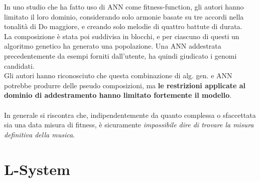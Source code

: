 \documentclass[a4paper,12pt]{report}
\begin{document}
In uno studio che ha fatto uso di ANN come fitness-function, gli autori hanno limitato il loro dominio, considerando solo armonie basate su tre accordi nella tonalità di Do maggiore, e creando solo melodie di quattro battute di durata. \\
La composizione è stata poi suddivisa in blocchi, e per ciascuno di questi un algoritmo genetico ha generato una popolazione.
Una ANN addestrata precedentemente da esempi forniti dall'utente, ha quindi giudicato i genomi candidati. \\
Gli autori hanno riconosciuto che questa combinazione di alg. gen. e ANN potrebbe produrre delle pseudo composizioni, 
ma \textbf{le restrizioni applicate al dominio di addestramento hanno limitato fortemente il modello}. \\
\\
In generale si riscontra che, indipendentemente da quanto complessa o sfaccettata sia una data misura di fitness, è sicuramente \textit{impossibile dire di trovare la misura definitiva della musica}. 

\section{L-System}
\end{document}
